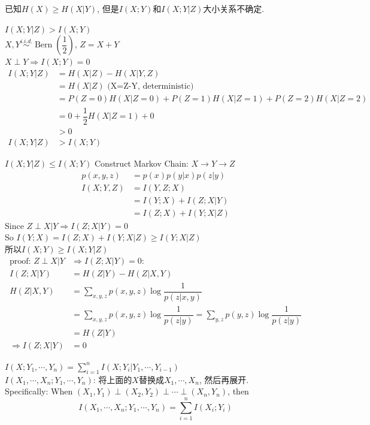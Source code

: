 已知$H(X)\geq H(X|Y)$, 但是$I(X;Y)$和$I(X;Y|Z)$大小关系不确定.
\begin{example}
$I(X;Y|Z)>I(X;Y)$\\
$X, Y \stackrel{i.i.d.}{\sim} \operatorname{Bern}\left(\dfrac{1}{2}\right)$, $Z=X+Y$\\
$X\perp Y\Rightarrow I(X;Y)=0$
\begin{align*}
I(X;Y|Z) &= H(X|Z) - H(X|Y,Z) \\
&= H(X|Z) \text{\ \ \ (X=Z-Y, deterministic)} \\
&= P(Z=0)H(X|Z=0) + P(Z=1)H(X|Z=1) + P(Z=2)H(X|Z=2) \\
&= 0 + \dfrac{1}{2}H(X|Z=1) + 0 \\
&> 0 \\
I(X;Y|Z) &> I(X;Y)
\end{align*}
\end{example}

\begin{example}
$I(X;Y|Z)\leq I(X;Y)$
Construct Markov Chain: $X\rightarrow Y\rightarrow Z$
\begin{align*}
p(x,y,z) &= p(x)p(y|x)p(z|y) \\
I(X;Y,Z) &= I(Y,Z;X) \\
&= I(Y;X) + I(Z;X|Y) \\
&= I(Z;X) + I(Y;X|Z)
\end{align*}
Since $Z\perp X|Y\Rightarrow I(Z;X|Y)=0$\\
So $I(Y;X)= I(Z;X) + I(Y;X|Z)\geq I(Y;X|Z)$\\
所以$I(X;Y)\geq I(X;Y|Z)$
\begin{align*}
\text{proof:  } Z\perp X|Y &\Rightarrow I(Z;X|Y)=0: \\
I(Z;X|Y) &= H(Z|Y) - H(Z|X,Y) \\
H(Z|X,Y) &= \sum_{x,y,z}p(x,y,z)\log\dfrac{1}{p(z|x,y)} \\
&= \sum_{x,y,z}p(x,y,z)\log\dfrac{1}{p(z|y)}
= \sum_{y,z}p(y,z)\log\dfrac{1}{p(z|y)} \\
&= H(Z|Y) \\
\Rightarrow I(Z;X|Y) &= 0
\end{align*}
\end{example}

\begin{proposition}
$I(X;Y_1,\cdots,Y_n)=\sum\limits_{i=1}^nI(X;Y_i|Y_1,\cdots,Y_{i-1})$\\
$I(X_1,\cdots,X_n;Y_1,\cdots,Y_n)$: 将上面的$X$替换成$X_1,\cdots,X_n$, 然后再展开.\\
Specifically: When $(X_1,Y_1) \perp (X_2,Y_2) \perp \cdots \perp (X_n,Y_n)$, then
$$I(X_1,\cdots,X_n;Y_1,\cdots,Y_n)=\sum\limits_{i=1}^{n}I(X_i;Y_i)$$
\end{proposition}

